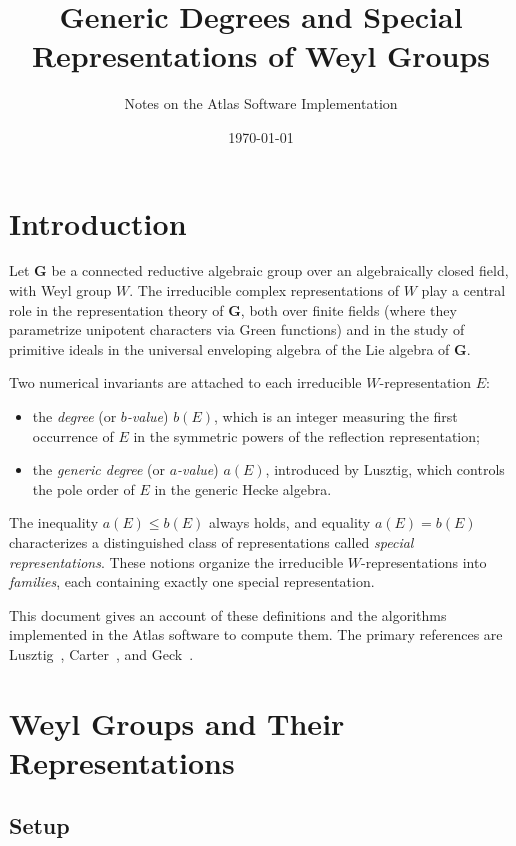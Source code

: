 \documentclass[12pt]{amsart}
\title{Generic Degrees and Special Representations of Weyl Groups}
\author{Notes on the Atlas Software Implementation}
\date{\today}
\newcommand{\bfG}{\mathbf{G}}
\begin{document}
\maketitle
\tableofcontents

\section{Introduction}

Let $\bfG$ be a connected reductive algebraic group over an algebraically
closed field, with Weyl group $W$. The irreducible complex representations of
$W$ play a central role in the representation theory of $\bfG$, both over
finite fields (where they parametrize unipotent characters via Green functions)
and in the study of primitive ideals in the universal enveloping algebra of the
Lie algebra of $\bfG$.

Two numerical invariants are attached to each irreducible $W$-representation
$E$:
\begin{itemize}
  \item the \emph{degree} (or \emph{$b$-value}) $b(E)$, which is an integer
        measuring the first occurrence of $E$ in the symmetric powers of the
        reflection representation;
  \item the \emph{generic degree} (or \emph{$a$-value}) $a(E)$, introduced by
        Lusztig, which controls the pole order of $E$ in the generic Hecke
        algebra.
\end{itemize}
The inequality $a(E) \leq b(E)$ always holds, and equality $a(E) = b(E)$
characterizes a distinguished class of representations called \emph{special
representations}.  These notions organize the irreducible $W$-representations
into \emph{families}, each containing exactly one special representation.

This document gives an account of these definitions and the algorithms
implemented in the Atlas software to compute them.  The primary references are
Lusztig~\cite{Lusztig:orange}, Carter~\cite{Carter:finite}, and
Geck~\cite{Geck:chevie}.

\section{Weyl Groups and Their Representations}

\subsection{Setup}
\end{document}
